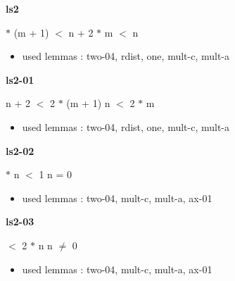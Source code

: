 \documentclass[a4paper]{article}
\begin{document}
\medskip

\bigskip

{\large\bf ls2}

\medskip

  $*$ (m + 1) $<$ n + 2  $*$ m $<$ n

\begin{itemize}


\item       used lemmas  : two-04, rdist, one, mult-c, mult-a

\end{itemize}

\medskip

\bigskip

{\large\bf ls2-01}

\medskip

 \Fol n + 2 $<$ 2 $*$ (m + 1) \Equiv n $<$ 2 $*$ m

\begin{itemize}


\item       used lemmas  : two-04, rdist, one, mult-c, mult-a

\end{itemize}

\medskip

\bigskip

{\large\bf ls2-02}

\medskip

  $*$ n $<$ 1 \Equiv n = 0

\begin{itemize}


\item       used lemmas  : two-04, mult-c, mult-a, ax-01

\end{itemize}

\medskip

\bigskip

{\large\bf ls2-03}

\medskip

  $<$ 2 $*$ n \Equiv n $\neq$ 0

\begin{itemize}


\item       used lemmas  : two-04, mult-c, mult-a, ax-01

\end{itemize}

\medskip

\bigskip
\end{document}
